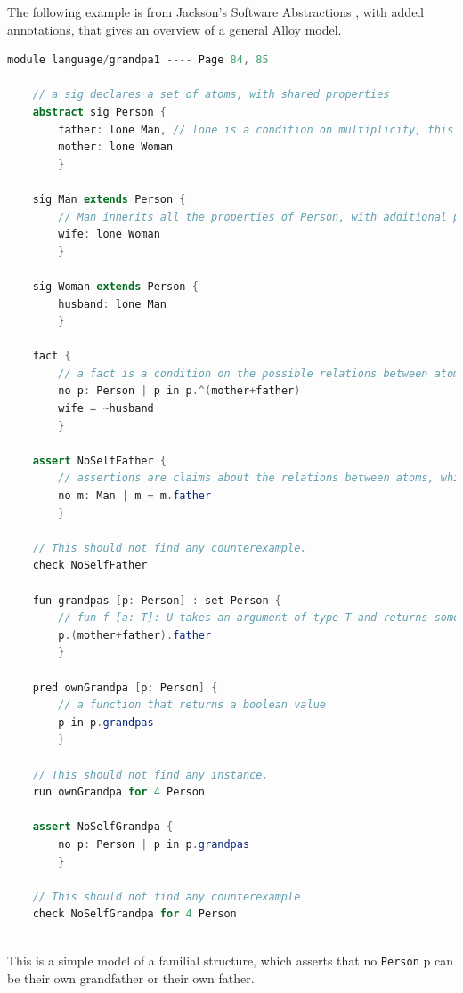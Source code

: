\documentclass[conference]{IEEEtran}
\begin{document}
The following example is from Jackson's Software Abstractions \cite{jackson-model}, with added annotations, that gives an overview of a general Alloy model.


\begin{lstlisting}[language=Java]
    module language/grandpa1 ---- Page 84, 85

    // a sig declares a set of atoms, with shared properties
    abstract sig Person {
        father: lone Man, // lone is a condition on multiplicity, this means that every Person p has exactly one Man m as p.father
        mother: lone Woman
        }
    
    sig Man extends Person {
        // Man inherits all the properties of Person, with additional properties
        wife: lone Woman
        }
    
    sig Woman extends Person {
        husband: lone Man
        }
    
    fact {
        // a fact is a condition on the possible relations between atoms
        no p: Person | p in p.^(mother+father)
        wife = ~husband
        }
    
    assert NoSelfFather {
        // assertions are claims about the relations between atoms, which are not necessarily true. They may be true as a consequence of the definitions of the sigs and facts, which is determined by the Analyzer
        no m: Man | m = m.father
        }
    
    // This should not find any counterexample.
    check NoSelfFather
    
    fun grandpas [p: Person] : set Person {
        // fun f [a: T]: U takes an argument of type T and returns something of type U
        p.(mother+father).father
        }
    
    pred ownGrandpa [p: Person] {
        // a function that returns a boolean value
        p in p.grandpas
        }
    
    // This should not find any instance.
    run ownGrandpa for 4 Person
    
    assert NoSelfGrandpa {
        no p: Person | p in p.grandpas
        }
    
    // This should not find any counterexample
    check NoSelfGrandpa for 4 Person
    
\end{lstlisting}

This is a simple model of a familial structure, which asserts that no \verb|Person| p can be their own grandfather or their own father. 
\end{document}
